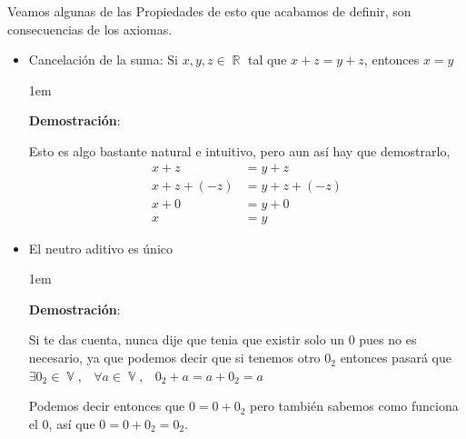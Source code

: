 \documentclass[12pt, fleqn]{report}                             %
\newenvironment{SmallIndentation}[1][0.75em]                    %
        {\begin{adjustwidth}{#1}{}\begin{footnotesize}}             %
        {\end{footnotesize}\end{adjustwidth}}                       %
\DeclareMathOperator \Space     {\quad}                         %
\DeclareMathOperator \MiniSpace {\;}                            %
\theoremstyle{break}                                            %
\DeclareMathOperator \Reals        {\mathbb{R}}                 %
\DeclareMathOperator \VectorSet    {\mathbb{V}}                 %
\begin{document}
                Veamos algunas de las Propiedades de esto que acabamos de definir, son consecuencias de los 
                axiomas.

                \begin{itemize}

                    \item Cancelación de la suma: 
                        Si $x, y, z \in \Reals$ tal que $x + z = y + z$, entonces $x = y$

                        \begin{SmallIndentation}[1em]
                            \textbf{Demostración}:

                            Esto es algo bastante natural e intuitivo, pero aun así hay que demostrarlo, 
                            \begin{align*}
                                x + z &= y + z                  \\
                                x + z + (-z) &= y + z + (-z)    \\
                                x + 0 &= y + 0                  \\
                                x &= y                          
                            \end{align*}

                        \end{SmallIndentation}


                    \item El neutro aditivo es único

                        \begin{SmallIndentation}[1em]
                            \textbf{Demostración}:

                            Si te das cuenta, nunca dije que tenia que existir solo un $0$ pues no es
                            necesario, ya que podemos decir que si tenemos otro $0_2$ entonces pasará que 
                            $\exists 0_2 \in \VectorSet, \MiniSpace
                                \forall a \in \VectorSet, \MiniSpace
                                    0_2 + a = a + 0_2 = a$

                            Podemos decir entonces que $0 = 0+0_2$ pero también sabemos como
                            funciona el $0$, así que $0 = 0+0_2 = 0_2$.


\end{SmallIndentation}
\end{itemize}
\end{document}
